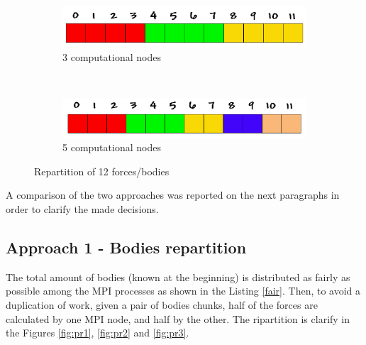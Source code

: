 \documentclass[a4paper]{article}
\begin{document}
\begin{figure}[!ht]
    \centering
    \begin{subfigure}[b]{0.5\textwidth}
        \centering
        \includegraphics[width=1\linewidth]{array_procs_3}
        \caption{3 computational nodes}
        \label{fig:repa1}
    \end{subfigure}%
    ~ 
    \begin{subfigure}[b]{0.5\textwidth}
        \centering
        \includegraphics[width=1\linewidth]{array_procs_5}
        \caption{5 computational nodes}
        \label{fig:repa2}
    \end{subfigure}
    \caption{Repartition of 12 forces/bodies}
    \label{fig:repa}
    	
\end{figure}
\FloatBarrier

A comparison of the two approaches was reported on the next paragraphs in order to clarify the made decisions.

\subsection{Approach 1 - Bodies repartition}
\label{sec:a1}

The total amount of bodies (known at the beginning) is distributed as fairly as possible among the  MPI processes as shown in the Listing \ref{fair}. Then, to avoid a duplication of work, given a pair of bodies chunks, half of the forces are calculated by one MPI node, and half by the other. The ripartition is clarify in the Figures \ref{fig:pr1}, \ref{fig:pr2} and \ref{fig:pr3}.
\end{document}
